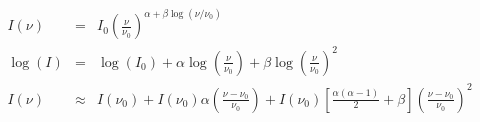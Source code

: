 \documentclass[10pt]{article}
\begin{document}
\begin{eqnarray}
I(\nu) &= &I_0 \left(\frac{\nu}{\nu_0}\right) ^ {\alpha + \beta\log(\nu/\nu_0)}\\
\log(I) &= &\log(I_0) + \alpha \log\left(\frac{\nu}{\nu_0}\right) + \beta \log\left(\frac{\nu}{\nu_0}\right)^2\\
I(\nu) & \approx &I(\nu_0) + I(\nu_0)\alpha\left(\frac{\nu-\nu_0}{\nu_0}\right) + I(\nu_0)\left[\frac{\alpha(\alpha-1)}{2}+\beta\right]\left(\frac{\nu-\nu_0}{\nu_0}\right)^2
\end{eqnarray}
\end{document}
